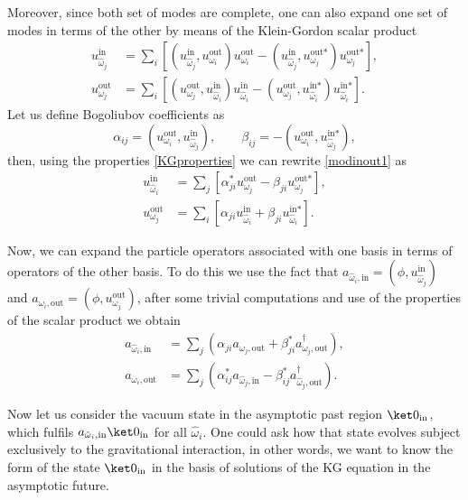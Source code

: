 Moreover, since both set of modes are complete, one can also expand one set of modes in terms of the other by means of the Klein-Gordon scalar product
\begin{align}\label{modinout1}
u^{\text{in}}_{\hat\omega_j}&= \sum_i \left[(u_{\hat\omega_j}^{\text{in}},u_{\omega_i}^{\text{out}})u_{\omega_i}^{\text{out}}-(u_{\hat\omega_j}^{\text{in}},u_{\omega_j}^{\text{out}*})u_{\omega_j}^{\text{out}*}\right],\\
u^{\text{out}}_{\omega_j}&= \sum_i \left[(u_{\omega_j}^{\text{out}},u_{\hat\omega_i}^{\text{in}})u_{\hat\omega_i}^{\text{in}}-(u_{\omega_j}^{\text{out}},u_{\hat\omega_i}^{\text{in}*})u_{\hat\omega_i}^{\text{in}*}\right].
\end{align}
Let us define Bogoliubov coefficients as
\begin{equation}
\alpha_{ij}=(u_{\omega_i}^{\text{out}},u_{\hat\omega_j}^{\text{in}}),\qquad \beta_{ij}=-(u_{\omega_i}^{\text{out}},u_{\hat\omega_j}^{\text{in}*}),
\end{equation}
then, using the properties \eqref{KGproperties} we can rewrite \eqref{modinout1} as
\begin{align}\label{modinout2}
u^{\text{in}}_{\hat\omega_i}&= \sum_j \left[\alpha_{ji}^{*}u_{\omega_j}^{\text{out}}-\beta_{ji}u_{\omega_j}^{\text{out}*}\right],\\
u^{\text{out}}_{\omega_j}&= \sum_i \left[\alpha_{ji}u_{\hat\omega_i}^{\text{in}}+\beta_{ji}u_{\hat\omega_i}^{\text{in}*}\right].
\end{align}

Now, we can expand the particle operators associated with one basis in terms of operators of the other basis. To do this we use the fact that $a_{\hat\omega_i,\text{in}}=(\phi,u_{\hat\omega_j}^{\text{in}})$ and $a_{\omega_i,\text{out}}=(\phi,u_{\omega_j}^{\text{out}})$, after some trivial computations and use of the properties of the scalar product we obtain
\begin{align}
\label{uno1}a_{\hat\omega_i,\text{in}}&=\sum_j \left(\alpha_{ji} a_{\omega_j,\text{out}}+\beta_{ji}^* a_{\omega_j,\text{out}}^\dagger\right),\\
a_{\omega_i,\text{out}}&=\sum_j \left(\alpha^*_{ij} a_{\hat\omega_j,\text{in}}-\beta_{ij}^* a_{\hat\omega_j,\text{out}}^\dagger\right).
\end{align}

Now let us consider the vacuum state in the asymptotic past region $\ket0_{\text{in}}$, which fulfils $a_{\hat\omega_i,\text{in}}\ket0_{\text{in}}$ for all $\hat\omega_i$. One could ask how that state evolves subject exclusively to the gravitational interaction, in other words, we want to know the form of the state $\ket0_{\text{in}}$ in the basis of solutions of the KG equation in the asymptotic future.


